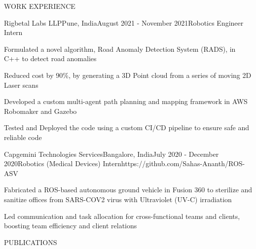 \documentclass{resume} %
\begin{document}
\begin{rSection}{WORK EXPERIENCE}
	\begin{rProjExpDetails}{Rigbetal Labs LLP}{Pune, India}{August 2021 - November 2021}{Robotics Engineer Intern}{}{}
		\item Formulated a novel algorithm, Road Anomaly Detection System (RADS), in C++ to detect road anomalies
		\item Reduced cost by 90\%, by generating a 3D Point cloud from a series of moving 2D Laser scans
		\item Developed a custom multi-agent path planning and mapping framework in AWS Robomaker and Gazebo
		\item Tested and Deployed the code using a custom CI/CD pipeline to ensure safe and reliable code
	\end{rProjExpDetails}

	\begin{rProjExpDetails}{Capgemini Technologies Services}{Bangalore, India}{July 2020 - December 2020}{Robotics (Medical Devices) Intern}{https://github.com/Sahas-Ananth/ROS-ASV}{}
		\item Fabricated a ROS-based autonomous ground vehicle in Fusion 360 to sterilize and sanitize offices from SARS-COV2 virus with Ultraviolet (UV-C) irradiation
		\item Led communication and task allocation for cross-functional teams and clients, boosting team efficiency and client relations
	\end{rProjExpDetails}
\end{rSection}
\begin{rSection}{PUBLICATIONS}
	\nocite{*}
	\printbibliography[heading=none]
\end{rSection}
\end{document}
